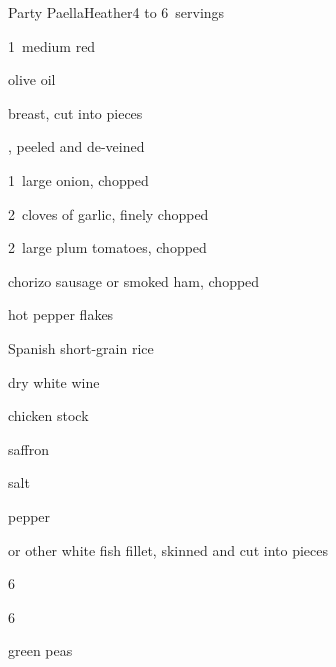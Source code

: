 \begin{recipe}{Party Paella}{Heather}{4 to 6~servings}

\begin{ingredients}
\item 1~medium red 
\item \C{\quarter} olive oil
\item \lbs{\half}  breast, cut into  pieces
\item \lbs{\half} , peeled and de-veined
\item 1~large onion, chopped
\item 2~cloves of garlic, finely chopped
\item 2~large plum tomatoes, chopped
\item \lbs{\quarter} chorizo sausage or smoked ham, chopped
\item \tp{\half} hot pepper flakes
\item \C{1\half} Spanish short-grain rice
\item \C{\half} dry white wine
\item {} chicken stock
\item \tp{\quarter} saffron
\item \tp{\half} salt
\item \tp{\quarter} pepper
\item \lbs{\half}  or other white fish fillet, skinned and cut into  pieces
\item 6~
\item 6~
\item {} green peas
\end{ingredients}


\end{recipe}
